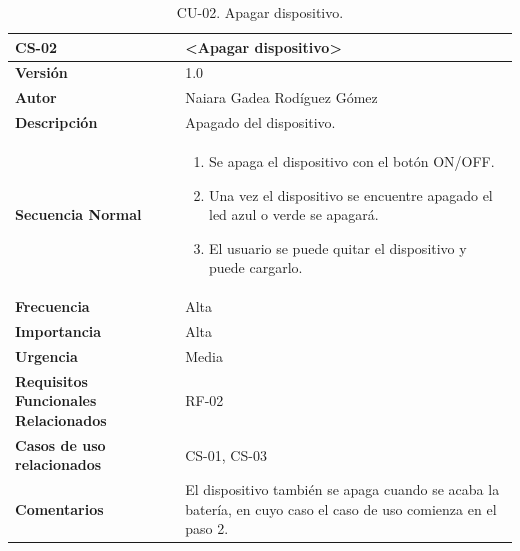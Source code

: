 \begin{table}[h!]
\centering
\begin{tabular}{ |m{3cm}|m{11cm}|  } 
\hline
\cellcolor[HTML]{B9E3F0}\textbf{CS-02} & \cellcolor[HTML]{B9E3F0}\textbf{<Apagar dispositivo>}\\

\hline
\cellcolor[HTML]{EFEFEF}\textbf{Versión}             & 1.0  \\
\hline
\cellcolor[HTML]{EFEFEF}\textbf{Autor}                & Naiara Gadea Rodíguez Gómez\\
\hline
\cellcolor[HTML]{EFEFEF}\textbf{Descripción}                & {Apagado del dispositivo.}\\
\hline
\cellcolor[HTML]{EFEFEF}\textbf{Secuencia \newline Normal}                &                 
        \begin{enumerate}
			\def\labelenumi{\arabic{enumi}.}
			\tightlist
			\item Se apaga el dispositivo con el botón ON/OFF.
			\item Una vez el dispositivo se encuentre apagado el led azul o verde se apagará.
                \item El usuario se puede quitar el dispositivo y puede cargarlo.
		\end{enumerate}\\
\hline
\cellcolor[HTML]{EFEFEF}\textbf{Frecuencia}                & Alta\\
\hline
\cellcolor[HTML]{EFEFEF}\textbf{Importancia}                & Alta\\
\hline
\cellcolor[HTML]{EFEFEF}\textbf{Urgencia}                & Media\\
\hline
\cellcolor[HTML]{EFEFEF}\textbf{Requisitos Funcionales Relacionados}                & {RF-02}\\
\hline
\cellcolor[HTML]{EFEFEF}\textbf{Casos de uso relacionados}                & {CS-01, CS-03}\\
\hline
\cellcolor[HTML]{EFEFEF}\textbf{Comentarios}                & {El dispositivo también se apaga cuando se acaba la batería, en cuyo caso el caso de uso comienza en el paso 2. }\\
\hline
\end{tabular}
\caption{CU-02. Apagar dispositivo.}
\end{table}

